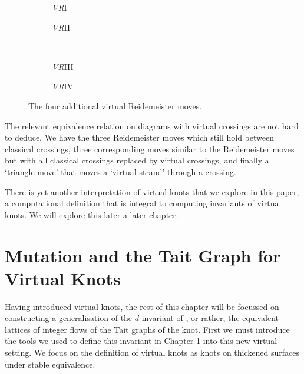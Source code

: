 \documentclass[12pt]{report}
\begin{document}
\begin{figure}[hbt]
	\centering
	\hspace*{\fill}
	\begin{subfigure}[b]{0.35 \textwidth}
		\centering
		\def\svgscale{0.22}
		
		\caption{\textit{VR}I}
	\end{subfigure}
	\hspace*{\fill}
	\begin{subfigure}[b]{0.35 \textwidth}
		\centering
		\def\svgscale{0.22}
		
		\caption{\textit{VR}II}
	\end{subfigure}
	\hspace*{\fill}
	\\
	\hspace*{\fill}
	\begin{subfigure}[b]{0.35 \textwidth}
		\centering
		\def\svgscale{0.22}
		
		\caption{\textit{VR}III}
	\end{subfigure}
	\hspace*{\fill}
	\begin{subfigure}[b]{0.35 \textwidth}
		\centering
		\def\svgscale{0.22}
		
		\caption{\textit{VR}IV}
	\end{subfigure}
	\hspace*{\fill}
	\caption{The four additional virtual Reidemeister moves.}
	\label{fig:virtual-reidemeister-moves}
\end{figure}

The relevant equivalence relation on diagrams with virtual crossings are not hard to deduce. We have the three Reidemeister moves which still hold between classical crossings, three corresponding moves similar to the Reidemeister moves but with all classical crossings replaced by virtual crossings, and finally a `triangle move' that moves a `virtual strand' through a crossing.

There is yet another interpretation of virtual knots that we explore in this paper, a computational definition that is integral to computing invariants of virtual knots. We will explore this later a later chapter.

\section{Mutation and the Tait Graph for Virtual Knots}
Having introduced virtual knots, the rest of this chapter will be focussed on constructing a generalisation of the $d$-invariant of \cite{lattices-graphs-mutation}, or rather, the equivalent lattices of integer flows of the Tait graphs of the knot. First we must introduce the tools we used to define this invariant in Chapter 1 into this new virtual setting. We focus on the definition of virtual knots as knots on thickened surfaces under stable equivalence.
\end{document}
